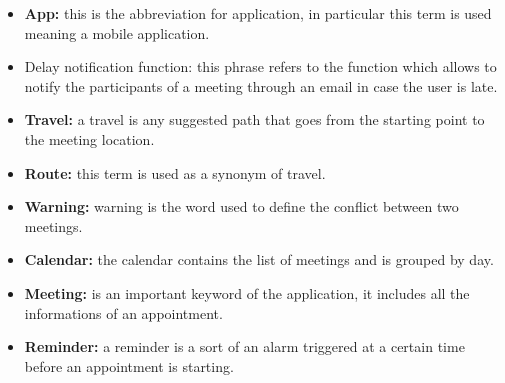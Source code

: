 \begin{itemize}

\item  \textbf{App:} this is the abbreviation for application, in particular this term is used meaning a mobile application.

\item  Delay notification function: this phrase refers to the function which allows to notify the participants of a meeting through an email in case the user is late.

\item  \textbf{Travel:} a travel is any suggested path that goes from the starting point to the meeting location.

\item  \textbf{Route:} this term is used as a synonym of travel.

\item  \textbf{Warning:} warning is the word used to define the conflict between two meetings.

\item  \textbf{Calendar:} the calendar contains the list of meetings and is grouped by day.

\item  \textbf{Meeting:} is an important keyword of the application, it includes all the informations of an appointment.

\item  \textbf{Reminder:} a reminder is a sort of an alarm triggered at a certain time before an appointment is starting.


\end{itemize}